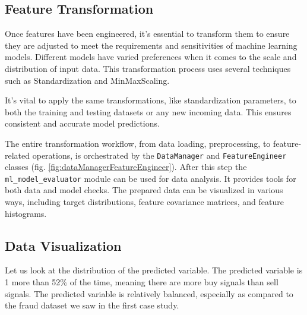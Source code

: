 \subsection{Feature Transformation}

Once features have been engineered, it's essential to transform them to ensure they are adjusted to meet the requirements and sensitivities of machine learning models. Different models have varied preferences when it comes to the scale and distribution of input data. This transformation process uses several techniques such as Standardization and MinMaxScaling.

It's vital to apply the same transformations, like standardization parameters, to both the training and testing datasets or any new incoming data. This ensures consistent and accurate model predictions.

The entire transformation workflow, from data loading, preprocessing, to feature-related operations, is orchestrated by the \texttt{DataManager} and \texttt{FeatureEngineer} classes (fig. \ref{fig:dataManagerFeatureEngineer}).
After this step the \texttt{ml\_model\_evaluator} module can be used for data analysis. It provides tools for both data and model checks. The prepared data can be visualized in various ways, including target distributions, feature covariance matrices, and feature histograms.

\subsection{Data Visualization}
Let us look at the distribution of the predicted variable. The predicted variable is 1 more than 52\% of the time, meaning there are more buy
signals than sell signals. The predicted variable is relatively balanced, especially as
compared to the fraud dataset we saw in the first case study.


